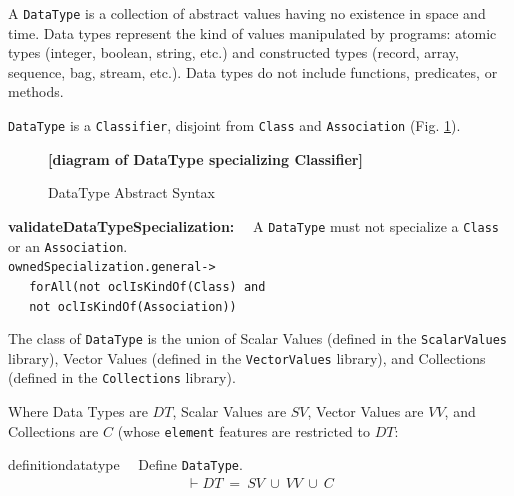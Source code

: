 \label{sec:datatypes}


\pn A \texttt{DataType} is a collection of abstract values having no existence in space and time.  Data types represent the kind of values manipulated by programs: atomic types (integer, boolean, string, etc.) and constructed types (record, array, sequence, bag, stream, etc.).  Data types do not include functions, predicates, or methods.

\pn \texttt{DataType} is a \texttt{Classifier}, disjoint from \texttt{Class} and \texttt{Association} (Fig. \ref{fig:datatypeabstractsyntax}).

\begin{figure}[htbp]
\begin{center}
\textbf{[diagram of DataType specializing Classifier]}
\caption{DataType Abstract Syntax}
\label{fig:datatypeabstractsyntax}
\end{center}
\end{figure}

\pn \textbf{validateDataTypeSpecialization:}~~
A \texttt{DataType} must not specialize a \texttt{Class} or an \texttt{Association}.\\
\texttt{ownedSpecialization.general->} \\
\hspace{10pt}~~\texttt{  forAll(not oclIsKindOf(Class) and} \\
\hspace{10pt}~~\texttt{  not oclIsKindOf(Association))}

\pn The class of \texttt{DataType} is the union of Scalar Values (defined in the \texttt{ScalarValues} library), Vector Values (defined in the \texttt{VectorValues} library), and Collections (defined in the \texttt{Collections} library).

Where Data Types are $DT$, Scalar Values are $SV$, Vector Values are $VV$, and Collections are $C$ (whose \texttt{element} features are restricted to $DT$:
\begin{restatable}{definition}{datatype}~~ Define \texttt{DataType}.  
\begin{align}
\vdash DT~=~SV~\cup~VV~\cup~C\label{eq:df-datatype}\tag{df-datatype}
\end{align}
\end{restatable}

